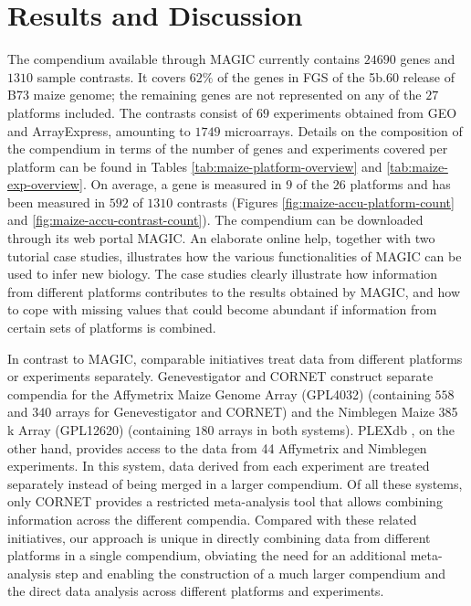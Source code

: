 \section{Results and Discussion}

The compendium available through MAGIC currently contains
$24690$ genes and $1310$ sample contrasts. It covers $62\%$ of the
genes in FGS of the 5b.60 release of B73 maize genome; the
remaining genes are not represented on any of the $27$ platforms
included. The contrasts consist of $69$ experiments obtained from
GEO and ArrayExpress, amounting to $1749$ microarrays. Details
on the composition of the compendium in terms of the number
of genes and experiments covered per platform can be found in
Tables \ref{tab:maize-platform-overview} and 
\ref{tab:maize-exp-overview}. 
On average, a gene is measured in $9$ of the $26$ platforms and has been 
measured 
in $592$ of $1310$ contrasts (Figures \ref{fig:maize-accu-platform-count} and 
\ref{fig:maize-accu-contrast-count}). 
The compendium can be downloaded through its web portal MAGIC. 
An elaborate online help, together with two tutorial case studies,
illustrates how the various functionalities of MAGIC can be
used to infer new biology. 
The case studies clearly illustrate how information from different platforms 
contributes to the results obtained by MAGIC, and how to cope with missing 
values that could become abundant if information from certain sets of
platforms is combined.

In contrast to MAGIC, comparable initiatives treat data from
different platforms or experiments separately. Genevestigator
\cite{Hruz2008} and CORNET \cite{DeBodt2012} construct 
separate compendia for the Affymetrix Maize Genome
Array (GPL4032) (containing $558$ and $340$ arrays for
Genevestigator and CORNET) and the Nimblegen Maize
385 k Array (GPL12620) (containing $180$ arrays in both systems).
PLEXdb \cite{Dash2011}, on the other hand, provides access
to the data from 44 Affymetrix and Nimblegen experiments. In
this system, data derived from each experiment are treated separately 
instead of being merged in a larger compendium. Of all
these systems, only CORNET provides a restricted meta-analysis
tool that allows combining information across the different compendia.
Compared with these related initiatives, our approach is
unique in directly combining data from different platforms in a
single compendium, obviating the need for an additional meta-analysis 
step \cite{Fierro2008} and enabling the construction
of a much larger compendium and the direct data analysis across
different platforms and experiments.



\cleardoublepage


